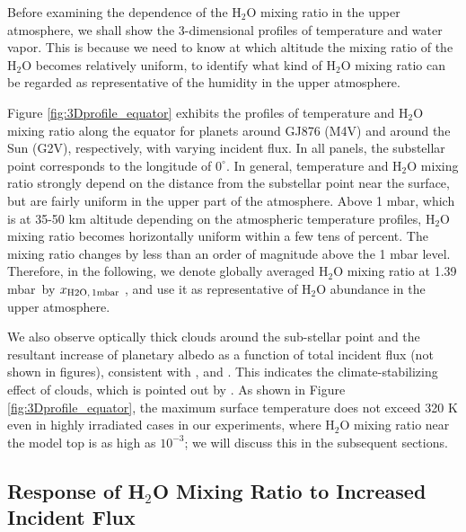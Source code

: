 \documentclass[11pt,numberedappendix,twocolappendix,]{emulateapj}
\def\water{H$_2$O }
\def\xwater{$x_{\rm H2O,\,1mbar}$ }
\def\preslevel{1.39 mbar\ }
\begin{document}
Before examining the dependence of the \water mixing ratio in the upper atmosphere, we shall show the 3-dimensional profiles of temperature and water vapor. 
This is because we need to know at which altitude the mixing ratio of the \water becomes relatively uniform, to identify what kind of \water mixing ratio can be regarded as representative of the humidity in the upper atmosphere. 

Figure \ref{fig:3Dprofile_equator} exhibits the profiles of temperature and \water mixing ratio along the equator for planets around GJ876 (M4V) and around the Sun (G2V), respectively, with varying incident flux. 
In all panels, the substellar point corresponds to the longitude of $0^{\circ }$. 
In general, temperature and \water mixing ratio strongly depend on the distance from the substellar point near the surface, but are fairly uniform in the upper part of the atmosphere. 
Above 1 mbar, which is at 35-50 km altitude depending on the atmospheric temperature profiles, \water mixing ratio becomes horizontally uniform within a few tens of percent. 
The mixing ratio changes by less than an order of magnitude above the 1 mbar level. 
Therefore, in the following, we denote globally averaged \water mixing ratio at \preslevel  by \xwater, and use it as representative of \water abundance in the upper atmosphere. 



We also observe optically thick clouds around the sub-stellar point and the resultant increase of planetary albedo as a function of total incident flux (not shown in figures), consistent with \citet{Yang2013,Yang2014}, \citet{Kopparapu2016} and \citet{Way2016}. 
This indicates the climate-stabilizing effect of clouds, which is pointed out by \citet{Yang2013}. 
As shown in Figure \ref{fig:3Dprofile_equator}, the maximum surface temperature does not exceed 320 K even in highly irradiated cases in our experiments, where \water mixing ratio near the model top is as high as $10^{-3}$; we will discuss this in the subsequent sections. 


\subsection{Response of \water Mixing Ratio to Increased Incident Flux}
\label{ss:result_H2Omixingratio}
\end{document}
